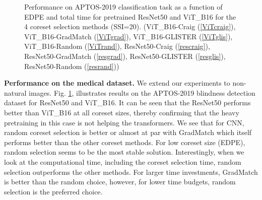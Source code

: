 \begin{figure}
\vspace{-1em}
\caption{Performance on APTOS-2019 classification task as a function of EDPE and total time for pretrained ResNet50 and ViT\_B16 for the 4 coreset selection methods (SSI=20). (ViT\_B16-Craig (\ref{ViTcraig}), ViT\_B16-GradMatch (\ref{ViTgrad}), ViT\_B16-GLISTER (\ref{ViTglis}), ViT\_B16-Random (\ref{ViTrand}), ResNet50-Craig (\ref{rescraig}), ResNet50-GradMatch (\ref{resgrad}), ResNet50-GLISTER (\ref{resglis}), ResNet50-Random (\ref{resrand}))}
\label{fig:ap-coresets}
\end{figure} 
\textbf{Performance on the medical dataset. } We extend our experiments to non-natural images. Fig. \ref{fig:ap-coresets}, illustrates results on the APTOS-2019 blindness detection dataset for ResNet50 and ViT\_B16. It can be seen that the ResNet50 performs better than ViT\_B16 at all coreset sizes, thereby confirming that the heavy pretraining in this case is not helping the transformers. We see that for CNN, random coreset selection is better or almost at par with GradMatch which itself performs better than the other coreset methods. For low coreset size (EDPE), random selection seems to be the most stable solution. Interestingly, when we look at the computational time, including the coreset selection time, random selection outperforms the other methods. For larger time investments, GradMatch is better than the random choice, however, for lower time budgets, random selection is the preferred choice.
